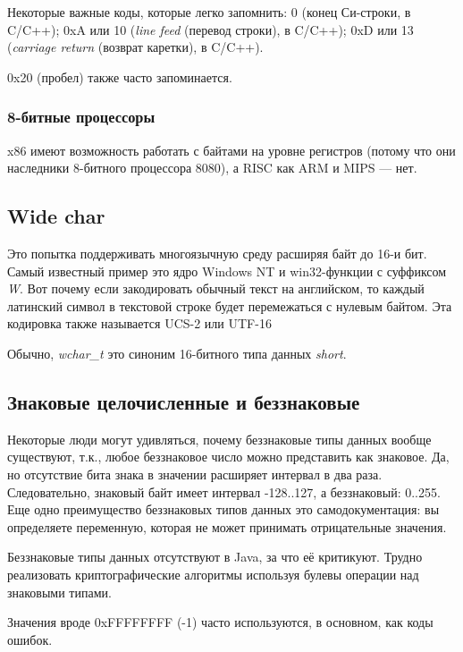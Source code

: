 Некоторые важные коды, которые легко запомнить:
0 (конец Си-строки,  в C/C++);
0xA или 10 (\emph{line feed} (перевод строки),  в C/C++);
0xD или 13 (\emph{carriage return} (возврат каретки),  в C/C++).

0x20 (пробел) также часто запоминается.

\subsubsection{8-битные процессоры}

x86 имеют возможность работать с байтами на уровне регистров (потому что они наследники 8-битного процессора 8080),
а RISC как ARM и MIPS --- нет.

\subsection{Wide char}

Это попытка поддерживать многоязычную среду расширяя байт до 16-и бит.
Самый известный пример это ядро Windows NT и win32-функции с суффиксом \emph{W}.
Вот почему если закодировать обычный текст на английском,
то каждый латинский символ в текстовой строке будет перемежаться с нулевым байтом.
Эта кодировка также называется UCS-2 или UTF-16

Обычно, \emph{wchar\_t} это синоним 16-битного типа данных \emph{short}.

\subsection{Знаковые целочисленные и беззнаковые}

Некоторые люди могут удивляться, почему беззнаковые типы данных вообще существуют, т.к., любое беззнаковое число
можно представить как знаковое.
Да, но отсутствие бита знака в значении расширяет интервал в два раза.
Следовательно, знаковый байт имеет интервал -128..127, а беззнаковый: 0..255.
Еще одно преимущество беззнаковых типов данных это самодокументация:
вы определяете переменную, которая не может принимать отрицательные значения.

Беззнаковые типы данных отсутствуют в Java, за что её критикуют.
Трудно реализовать криптографические алгоритмы используя булевы операции над знаковыми типами.

Значения вроде 0xFFFFFFFF (-1) часто используются, в основном, как коды ошибок.

